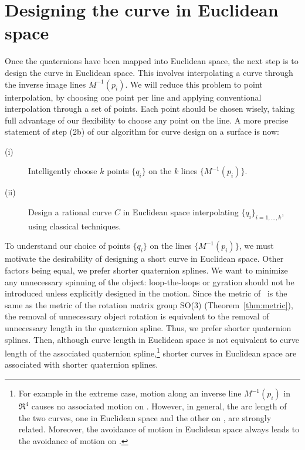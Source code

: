
\section{Designing the curve in Euclidean space}
\label{sec:eucdesign}

Once the quaternions have been mapped into Euclidean space,
the next step is to design the curve in Euclidean space.
This involves interpolating a curve through the 
inverse image lines $M^{-1}(p_i)$.
We will reduce this problem to point interpolation, 
by choosing one point per line
and applying conventional interpolation through a set of points.
Each point should be chosen wisely, taking full advantage of our
flexibility to choose any point on the line.
A more precise statement of step (2b) of our algorithm
for curve design on a surface is now:
%
\begin{description}
\item[(i)] 
	Intelligently choose $k$ points
	$\{q_i\}$ on the $k$ lines $\{M^{-1}(p_i)\}$.
\item[(ii)]
	Design a rational curve $C$ in Euclidean space
	interpolating $\{q_i\}_{i=1,\ldots,k}$, using classical techniques.
\end{description}

To understand our choice of points $\{q_i\}$ on the lines
$\{M^{-1}(p_i)\}$, we must motivate the desirability of designing
a short curve in Euclidean space.
Other factors being equal, we prefer shorter quaternion splines.
We want to minimize any unnecessary spinning of the object:
loop-the-loops or gyration should not be introduced 
unless explicitly designed in the motion.
Since the metric of \ is the same as the metric of the rotation
matrix group SO(3) (Theorem~\ref{thm:metric}), 
the removal of unnecessary object rotation is equivalent to the
removal of unnecessary length in the quaternion spline.
Thus, we prefer shorter quaternion splines.
Then, although curve length in Euclidean space is not
equivalent to curve length of the associated quaternion 
spline,\footnote{For example in the extreme case, motion along
	an inverse line $M^{-1}(p_i)$ in $\Re^4$ causes no associated
	motion on .  However, in general, the arc length
	of the two curves, one in Euclidean space and the other on ,
	are strongly related.
	Moreover, the avoidance of motion in Euclidean space always leads 
	to the avoidance of motion on .}
shorter curves in Euclidean space are associated with shorter
quaternion splines.

